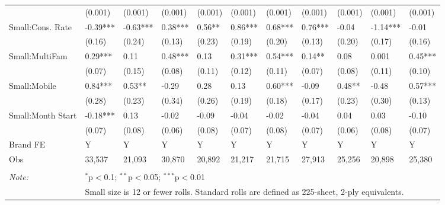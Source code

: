\begin{table}[]
{\begin{tabular}{lllllllllll}
                       & (0.001)  & (0.001)   & (0.001)  & (0.001)  & (0.001)  & (0.001)  & (0.001)   & (0.001)     & (0.001)  & (0.001)  \\
Small:Cons. Rate       & -0.39*** & -0.63***  & 0.38***  & 0.56**   & 0.86***  & 0.68***  & 0.76***   & -0.04       & -1.14*** & -0.01    \\
                       & (0.16)   & (0.24)    & (0.13)   & (0.23)   & (0.19)   & (0.20)   & (0.13)    & (0.20)      & (0.17)   & (0.16)   \\
Small:MultiFam         & 0.29***  & 0.11      & 0.48***  & 0.13     & 0.31***  & 0.54***  & 0.14**    & 0.08        & 0.001    & 0.45***  \\
                       & (0.07)   & (0.15)    & (0.08)   & (0.11)   & (0.12)   & (0.11)   & (0.07)    & (0.08)      & (0.11)   & (0.10)   \\
Small:Mobile           & 0.84***  & 0.53**    & -0.29    & 0.28     & 0.13     & 0.60***  & -0.09     & 0.48**      & -0.48    & 0.57***  \\
                       & (0.28)   & (0.23)    & (0.34)   & (0.26)   & (0.19)   & (0.18)   & (0.17)    & (0.23)      & (0.30)   & (0.13)   \\
Small:Month Start      & -0.18*** & 0.13      & -0.02    & -0.09    & -0.04    & -0.02    & -0.04     & 0.04        & 0.03     & -0.10    \\
                       & (0.07)   & (0.08)    & (0.06)   & (0.08)   & (0.07)   & (0.08)   & (0.07)    & (0.06)      & (0.08)   & (0.07)   \\
Brand FE               & Y        & Y         & Y        & Y        & Y        & Y        & Y         & Y           & Y        & Y        \\
Obs                    & 33,537   & 21,093    & 30,870   & 20,892   & 21,217   & 21,715   & 27,913    & 25,256      & 20,898   & 25,380   \\
\hline
\hline \\[-1.8ex]
\textit{Note:}  & \multicolumn{10}{l}{$^{*}$p$<$0.1; $^{**}$p$<$0.05; $^{***}$p$<$0.01} \\
& \multicolumn{10}{l}{Small size is 12 or fewer rolls. Standard rolls are defined as 225-sheet, 2-ply equivalents.} \\
\end{tabular}%
}
\end{table}
